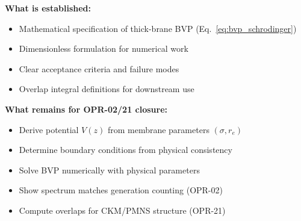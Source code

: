 \begin{tcolorbox}[colback=blue!5!white, colframe=blue!50!black,
    title=\textbf{BVP Work Package: Bottom Line}]
\textbf{What is established:}
\begin{itemize}[nosep]
    \item Mathematical specification of thick-brane BVP (Eq.~\eqref{eq:bvp_schrodinger})
    \item Dimensionless formulation for numerical work
    \item Clear acceptance criteria and failure modes
    \item Overlap integral definitions for downstream use
\end{itemize}

\textbf{What remains for OPR-02/21 closure:}
\begin{itemize}[nosep]
    \item Derive potential $V(z)$ from membrane parameters $(\sigma, r_e)$
    \item Determine boundary conditions from physical consistency
    \item Solve BVP numerically with physical parameters
    \item Show spectrum matches generation counting (OPR-02)
    \item Compute overlaps for CKM/PMNS structure (OPR-21)
\end{itemize}

\medskip
\noindent{}
\end{tcolorbox}

